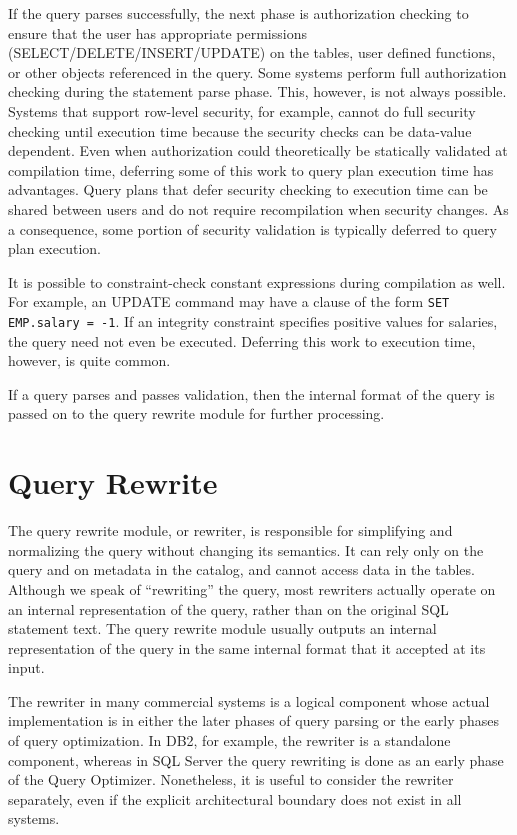 \documentclass[a4paper,11pt,twoside,openright]{book}
\begin{document}
If the query parses successfully, the next phase is authorization
checking to ensure that the user has appropriate permissions
(SELECT/DELETE/INSERT/UPDATE) on the tables, user defined functions, or
other objects referenced in the query. Some systems perform full
authorization checking during the statement parse phase. This, however,
is not always possible. Systems that support row-level security, for
example, cannot do full security checking until execution time because
the security checks can be data-value dependent. Even when authorization
could theoretically be statically validated at compilation time,
deferring some of this work to query plan execution time has advantages.
Query plans that defer security checking to execution time can be shared
between users and do not require recompilation when security changes. As
a consequence, some portion of security validation is typically deferred
to query plan execution.

It is possible to constraint-check constant expressions during
compilation as well. For example, an UPDATE command may have a clause of
the form \texttt{SET EMP.salary = -1}. If an integrity constraint specifies
positive values for salaries, the query need not even be executed.
Deferring this work to execution time, however, is quite common.

If a query parses and passes validation, then the internal format of the
query is passed on to the query rewrite module for further processing.

\hypertarget{query-rewrite}{%
\section{Query Rewrite}\label{query-rewrite}}

The query rewrite module, or rewriter, is responsible for simplifying
and normalizing the query without changing its semantics. It can rely
only on the query and on metadata in the catalog, and cannot access data
in the tables. Although we speak of ``rewriting'' the query, most
rewriters actually operate on an internal representation of the query,
rather than on the original SQL statement text. The query rewrite module
usually outputs an internal representation of the query in the same
internal format that it accepted at its input.

The rewriter in many commercial systems is a logical component whose
actual implementation is in either the later phases of query parsing or
the early phases of query optimization. In DB2, for example, the
rewriter is a standalone component, whereas in SQL Server the query
rewriting is done as an early phase of the Query Optimizer. Nonetheless,
it is useful to consider the rewriter separately, even if the explicit
architectural boundary does not exist in all systems.
\end{document}

